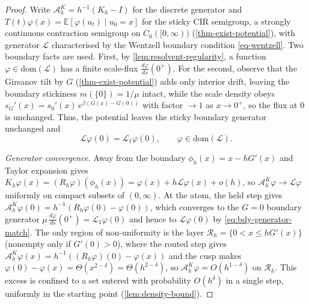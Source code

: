 \documentclass[aap,preprint]{imsart}
\numberwithin{equation}{section}
\theoremstyle{plain}
\theoremstyle{definition}
\begin{document}
\begin{proof}
  Write $\mathcal{A}_h^K=h^{-1}(K_h-I)$ for the discrete generator and
  $T(t)\varphi(x)=\mathbb{E}[\varphi(u_t)\mid u_0=x]$ for the sticky CIR
  semigroup, a strongly continuous contraction semigroup on $C_0([0,\infty))$
  (\cref{thm-exist-potential}), with generator $\mathcal{L}$ characterised by the Wentzell
  boundary condition \cref{eq-wentzell}.
  Two boundary facts are used.  First, by \cref{lem:resolvent-regularity}, a
  function $\varphi\in\mathrm{dom}(\mathcal{L})$ has a finite scale-flux
  $\tfrac{d\varphi}{ds}(0^+)$. For the second, observe that the Girsanov tilt by $G$ (\cref{thm-exist-potential}) adds only interior
  drift, leaving the boundary stickiness $m(\{0\})=1/\mu$ intact, while the
  scale density obeys $s_G'(x)=s_0'(x)\,e^{\beta(G(x)-G(0))}$ with factor
  $\to1$ as $x\to0^+$, so the flux at $0$ is unchanged. Thus,  the potential leaves the sticky
  boundary generator unchanged and
  \begin{equation}\label{eq:bdy-generator-match}
    \mathcal{L}\varphi(0)=\mathcal{L}_1\varphi(0),
    \qquad\varphi\in\mathrm{dom}(\mathcal{L}).
  \end{equation}
  

  \emph{Generator convergence.}  Away from the boundary $\phi_h(x)=x-hG'(x)$ and
  Taylor expansion gives
  $K_h\varphi(x)=(R_h\varphi)(\phi_h(x))=\varphi(x)+h\mathcal{L}\varphi(x)+o(h)$,
  so $\mathcal{A}_h^K\varphi\to\mathcal{L}\varphi$ uniformly on compact subsets
  of $(0,\infty)$.  At the atom, the held step gives
  $\mathcal{A}_h^K\varphi(0)=h^{-1}(R_h\varphi(0)-\varphi(0))$, which converges
  to the $G=0$ boundary generator $\mu\,\tfrac{d\varphi}{ds}(0^+)
  =\mathcal{L}_1\varphi(0)$ and hence to
  $\mathcal{L}\varphi(0)$ by \eqref{eq:bdy-generator-match}.  The only region of
  non-uniformity is the layer $\mathcal{R}_h=\{0<x\le hG'(x)\}$ (nonempty only
  if $G'(0)>0$), where the routed step gives
  $\mathcal{A}_h^K\varphi(x)=h^{-1}((R_h\varphi)(0)-\varphi(x))$ and the cusp
  makes $\varphi(0)-\varphi(x)=\Theta(x^{2-\delta})=\Theta(h^{2-\delta})$, so
  $\mathcal{A}_h^K\varphi=O(h^{1-\delta})$ on $\mathcal{R}_h$.  This excess is
  confined to a set entered with probability $O(h^\delta)$ in a single step,
  uniformly in the starting point (\cref{lem:density-bound}).


\end{proof}
\end{document}
